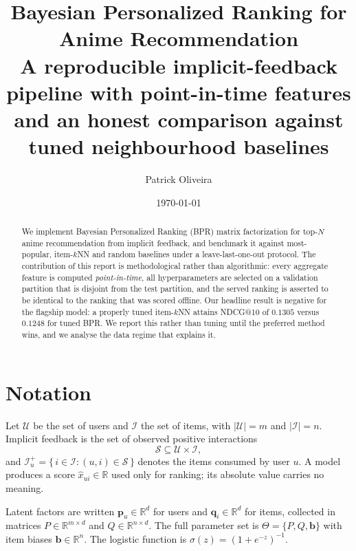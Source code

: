 \documentclass[11pt,a4paper]{article}
\title{\textbf{Bayesian Personalized Ranking for Anime Recommendation}\\[0.4em]
\large A reproducible implicit-feedback pipeline with point-in-time features\\
and an honest comparison against tuned neighbourhood baselines}
\author{Patrick Oliveira}
\date{\today}
\newcommand{\Rset}{\mathcal{S}}
\newcommand{\Uset}{\mathcal{U}}
\newcommand{\Iset}{\mathcal{I}}
\newcommand{\pvec}{\mathbf{p}}
\newcommand{\qvec}{\mathbf{q}}
\begin{document}
\maketitle

\begin{abstract}
We implement Bayesian Personalized Ranking (BPR) matrix factorization for
top-$N$ anime recommendation from implicit feedback, and benchmark it against
most-popular, item-$k$NN and random baselines under a leave-last-one-out
protocol. The contribution of this report is methodological rather than
algorithmic: every aggregate feature is computed \emph{point-in-time}, all
hyperparameters are selected on a validation partition that is disjoint from
the test partition, and the served ranking is asserted to be identical to the
ranking that was scored offline. Our headline result is negative for the
flagship model: a properly tuned item-$k$NN attains NDCG@10 of $0.1305$ versus
$0.1248$ for tuned BPR. We report this rather than tuning until the preferred
method wins, and we analyse the data regime that explains it.
\end{abstract}

\tableofcontents
\newpage

\section{Notation}
\label{sec:notation}

Let $\Uset$ be the set of users and $\Iset$ the set of items, with
$|\Uset| = m$ and $|\Iset| = n$. Implicit feedback is the set of observed
positive interactions
\begin{equation}
  \Rset \subseteq \Uset \times \Iset ,
\end{equation}
and $\Iset_u^{+} = \{\, i \in \Iset : (u,i) \in \Rset \,\}$ denotes the items
consumed by user $u$. A model produces a score $\hat{x}_{ui} \in \mathbb{R}$
used only for ranking; its absolute value carries no meaning.

Latent factors are written $\pvec_u \in \mathbb{R}^{d}$ for users and
$\qvec_i \in \mathbb{R}^{d}$ for items, collected in matrices
$P \in \mathbb{R}^{m \times d}$ and $Q \in \mathbb{R}^{n \times d}$. The full
parameter set is $\Theta = \{P, Q, \mathbf{b}\}$ with item biases
$\mathbf{b} \in \mathbb{R}^{n}$. The logistic function is
$\sigma(z) = (1 + e^{-z})^{-1}$.











\end{document}
